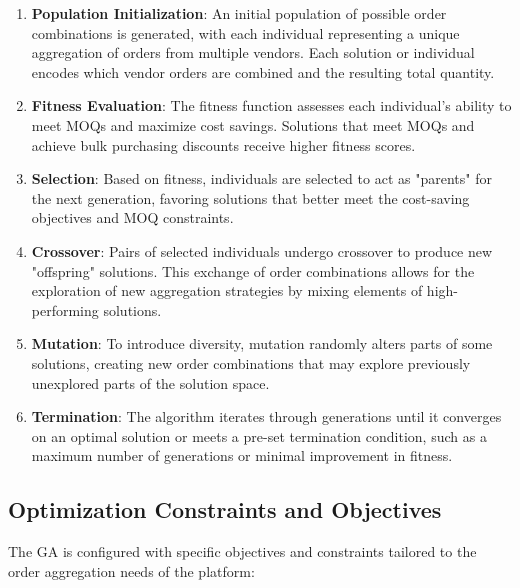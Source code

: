 \begin{enumerate}
    \item \textbf{Population Initialization}: An initial population of possible order combinations is generated, with each individual representing a unique aggregation of orders from multiple vendors. Each solution or individual encodes which vendor orders are combined and the resulting total quantity.
    
    \item \textbf{Fitness Evaluation}: The fitness function assesses each individual’s ability to meet MOQs and maximize cost savings. Solutions that meet MOQs and achieve bulk purchasing discounts receive higher fitness scores.
    
    \item \textbf{Selection}: Based on fitness, individuals are selected to act as "parents" for the next generation, favoring solutions that better meet the cost-saving objectives and MOQ constraints.
    
    \item \textbf{Crossover}: Pairs of selected individuals undergo crossover to produce new "offspring" solutions. This exchange of order combinations allows for the exploration of new aggregation strategies by mixing elements of high-performing solutions.
    
    \item \textbf{Mutation}: To introduce diversity, mutation randomly alters parts of some solutions, creating new order combinations that may explore previously unexplored parts of the solution space.
    
    \item \textbf{Termination}: The algorithm iterates through generations until it converges on an optimal solution or meets a pre-set termination condition, such as a maximum number of generations or minimal improvement in fitness.
\end{enumerate}

\subsection{Optimization Constraints and Objectives}

The GA is configured with specific objectives and constraints tailored to the order aggregation needs of the platform:

